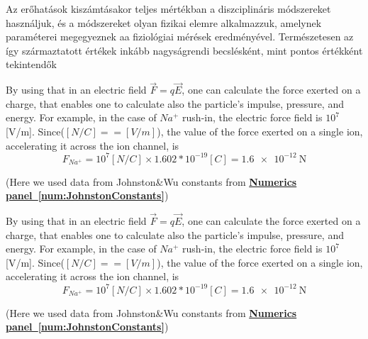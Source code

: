 Az erőhatások kiszámtásakor teljes mértékban a 
diszciplináris módszereket használjuk, és a módszereket
olyan fizikai elemre alkalmazzuk, amelynek paraméterei
megegyeznek aa fiziológiai mérések eredményével.
Természetesen az így származtatott értékek 
inkább nagyságrendi becslésként, mint pontos értékként
tekintendők
\fi



\ifx\magyar\undefined
{}
{ By using that in an electric field $\vec F = q \vec E$, one can calculate the force exerted on a charge, that enables one to calculate also the particle's impulse, pressure, and energy. For example, in the case of $Na^+$ rush-in, the electric force field is $10^7$ [V/m].
 Since($[N/C]==[V/m]$),
the value of the force exerted on a single ion, accelerating it across the ion channel, is
\begin{equation}
	F_{Na^+}= 10^7  [N/C] \times 1.602* 10^{-19} [C] = %
	\SI{1.6e-12}{\newton}
	\label{eq:UnitForce}
\end{equation}

(Here we used data from Johnston\&Wu constants from \textbf{\hyperlink{num:JohnstonConstants}{Numerics panel~\ref{num:JohnstonConstants}}})
}

\else

{ By using that in an electric field $\vec F = q \vec E$, one can calculate the force exerted on a charge, that enables one to calculate also the particle's impulse, pressure, and energy. For example, in the case of $Na^+$ rush-in, the electric force field is $10^7$ [V/m].
 Since($[N/C]==[V/m]$),
the value of the force exerted on a single ion, accelerating it across the ion channel, is
\begin{equation}
	F_{Na^+}= 10^7  [N/C] \times 1.602* 10^{-19} [C] = %
	\SI{1.6e-12}{\newton}
	\label{eq:UnitForce}
\end{equation}

(Here we used data from Johnston\&Wu constants from \textbf{\hyperlink{num:JohnstonConstants}{Numerics panel~\ref{num:JohnstonConstants}}})
}

\fi


